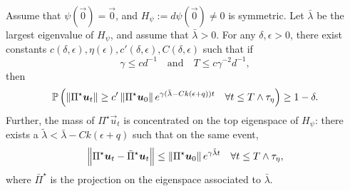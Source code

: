 \begin{proposition}\label{2405:prop:app:low_dim_exp}
  Assume that $\psi(\vec{0}) = \vec{0}$, and $H_\psi := d\psi(\vec{0}) \neq 0$ is symmetric. Let $\bar\lambda$ be the largest eigenvalue of $H_\psi$, and assume that $\bar\lambda > 0$.
  For any $\delta, \epsilon > 0$, there exist constants $c(\delta, \epsilon), \eta(\epsilon), c'(\delta, \epsilon), C(\delta, \epsilon)$ such that if
  \begin{equation}
    \gamma \leq c d^{-1} \quad \text{and} \quad T \leq c  \gamma^{-2} d^{-1},
  \end{equation}
  then
  \begin{equation}
    \mathbb{P}\left(\left\lVert \Pi^\star {\boldsymbol{u}}_t\right\rVert \geq c' \left\lVert \Pi^\star {\boldsymbol{u}}_0\right\rVert e^{\gamma(\bar\lambda - Ck(\epsilon + q))t} \quad \forall t \leq T \wedge \tau_\eta \right) \geq 1 - \delta.
  \end{equation}
  Further, the mass of $\Pi^\star \vec{u}_t$ is concentrated on the top eigenspace of $H_\psi$: there exists a $\tilde\lambda < \bar\lambda - Ck(\epsilon + q)$ such that on the same event,
  \[ \left\lVert \Pi^\star {\boldsymbol{u}}_t - \bar\Pi^\star {\boldsymbol{u}}_t\right\rVert \leq \left\lVert \Pi^\star {\boldsymbol{u}}_0\right\rVert e^{\gamma \tilde\lambda t} \quad \forall t \leq T \wedge \tau_\eta, \]
  where $\bar\Pi^\star$ is the projection on the eigenspace associated to $\bar\lambda$.
\end{proposition}

